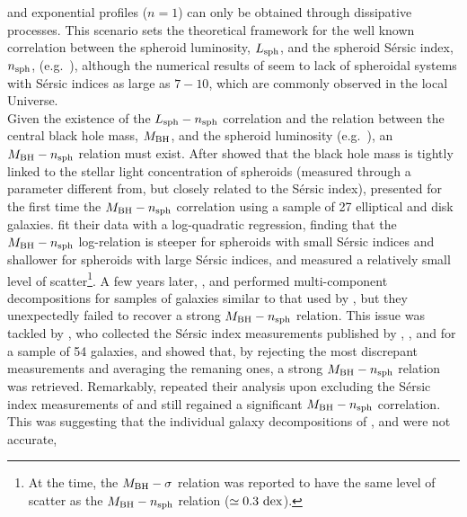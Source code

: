 \documentclass[preprint2]{emulateapj}
\begin{document}
and exponential profiles ($n=1$) can only be obtained through dissipative processes.
This scenario sets the theoretical framework for the well known correlation between the spheroid luminosity, $L_{\rm sph}$,  
and the spheroid S\'ersic index, $n_{\rm sph}$, (e.g.~\citealt{youngcurrie1994,jerjen2000,grahamguzman2003}), 
although the numerical results of \cite{nipoti2015} seem to lack of spheroidal systems with S\'ersic indices as large as $7 - 10$, 
which are commonly observed in the local Universe.  \\
Given the existence of the $L_{\rm sph} - n_{\rm sph}$ correlation 
and the relation between the central black hole mass, $M_{\rm BH}$, and the spheroid luminosity 
(e.g.~\citealt{kormendyrichstone1995,magorrian1998,marconihunt2003,haringrix2004}), 
an $M_{\rm BH} - n_{\rm sph}$ relation must exist. 
After \cite{graham2001bulges} showed that the black hole mass is tightly linked to the stellar light concentration of spheroids 
(measured through a parameter different from, but closely related to the S\'ersic index), 
\cite{grahamdriver2007} presented for the first time the $M_{\rm BH} - n_{\rm sph}$ correlation 
using a sample of 27 elliptical and disk galaxies. 
\cite{grahamdriver2007} fit their data with a log-quadratic regression, 
finding that the $M_{\rm BH} - n_{\rm sph}$ log-relation is steeper for spheroids with small S\'ersic indices 
and shallower for spheroids with large S\'ersic indices, 
and measured a relatively small level of scatter\footnote{At the time, the $M_{\rm BH} - \sigma$ relation 
\citep{ferraresemerritt2000,gebhardt2000} was reported to have the same level of scatter as the $M_{\rm BH} - n_{\rm sph}$ 
relation ($\simeq 0.3~\rm dex$). }.
A few years later, \cite{sani2011}, \cite{vika2012} and \cite{beifiori2012} performed multi-component decompositions 
for samples of galaxies similar to that used by \cite{grahamdriver2007}, 
but they unexpectedly failed to recover a strong $M_{\rm BH} - n_{\rm sph}$ relation. 
This issue was tackled by \cite{savorgnan2013}, who collected the S\'ersic index measurements published by 
\cite{grahamdriver2007}, \cite{sani2011}, \cite{vika2012} and \cite{beifiori2012} for a sample of 54 galaxies, 
and showed that, by rejecting the most discrepant measurements and averaging the remaning ones, 
a strong $M_{\rm BH} - n_{\rm sph}$ relation was retrieved. 
Remarkably, \cite{savorgnan2013} repeated their analysis upon excluding the S\'ersic index measurements of \cite{grahamdriver2007} 
and still regained a significant $M_{\rm BH} - n_{\rm sph}$ correlation. 
This was suggesting that the individual galaxy decompositions of \cite{sani2011}, \cite{vika2012} and \cite{beifiori2012} were not accurate, 
\end{document}
